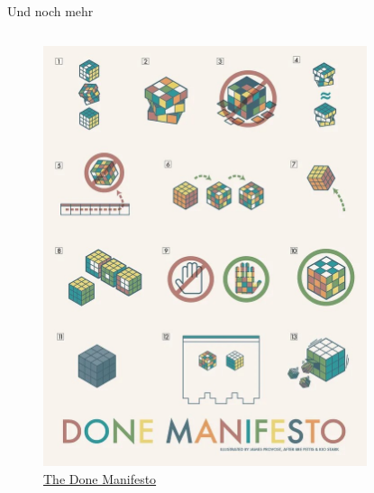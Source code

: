 \begin{frame}{Und noch mehr}
    \begin{columns}[t]
    \begin{column}{0.49\textwidth}
        \begin{figure}
            \begin{flushleft}
                \includegraphics[height=0.7\textheight]{graphics/TheDoneManifesto.jpg}
                \caption*{\href{https://medium.com/@bre/the-cult-of-done-manifesto-724ca1c2ff13}{The Done Manifesto}}   
            \end{flushleft}                
        \end{figure}        
    \end{column}
    \begin{column}{0.49\textwidth}
        \begin{figure}
            \begin{flushleft}

\end{flushleft}
\end{figure}
\end{column}
\end{columns}
\end{frame}

